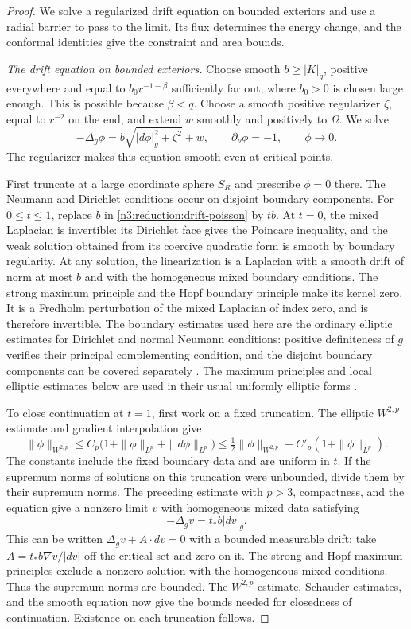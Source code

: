 \begin{proof}
We solve a regularized drift equation on bounded exteriors and use a
radial barrier to pass to the limit. Its flux determines the energy
change, and the conformal identities give the constraint and area bounds.

\emph{The drift equation on bounded exteriors.} Choose smooth
$b\ge|K|_g$, positive everywhere and equal to
$b_0r^{-1-\beta}$ sufficiently far out, where $b_0>0$ is chosen large
enough.  This is possible because $\beta<q$.  Choose a smooth positive
regularizer $\zeta$, equal to $r^{-2}$ on the end, and extend $w$ smoothly
and positively to $\Omega$.  We solve
\begin{equation}
 \label{n3:reduction:drift-poisson}
 -\Delta_g\phi=b\sqrt{|d\phi|_g^2+\zeta^2}+w,
 \qquad \partial_\nu\phi=-1,
 \qquad \phi\longrightarrow0.
\end{equation}
The regularizer makes this equation smooth even at critical points.

First truncate at a large coordinate sphere $S_R$ and prescribe
$\phi=0$ there.  The Neumann and Dirichlet conditions occur on disjoint
boundary components.  For $0\le t\le1$, replace $b$ in
\eqref{n3:reduction:drift-poisson} by $tb$.  At $t=0$, the mixed
Laplacian is invertible: its Dirichlet face gives the Poincare inequality,
and the weak solution obtained from its coercive quadratic form is smooth
by boundary regularity.  At any solution, the linearization is a
Laplacian with a smooth drift of norm at most $b$ and with the homogeneous
mixed boundary conditions.  The strong maximum principle and the Hopf
boundary principle make its kernel zero.  It is a Fredholm perturbation
of the mixed Laplacian of index zero, and is therefore invertible.
The boundary estimates used here are the ordinary elliptic estimates
for Dirichlet and normal Neumann conditions: positive definiteness of
$g$ verifies their principal complementing condition, and the disjoint
boundary components can be covered separately
\cite{AgmonDouglisNirenberg1959}.  The maximum principles and local
elliptic estimates below are used in their usual uniformly elliptic
forms \cite{GilbargTrudinger}.

To close continuation at $t=1$, first work on a fixed truncation.
The elliptic $W^{2,p}$ estimate
and gradient interpolation give
\[
 \|\phi\|_{W^{2,p}}
 \le C_p\bigl(1+\|\phi\|_{L^p}+\|d\phi\|_{L^p}\bigr)
 \le \tfrac12\|\phi\|_{W^{2,p}}
       +C'_p(1+\|\phi\|_{L^p}).
\]
The constants include the fixed boundary data and are uniform in $t$.
If the supremum norms of solutions on this truncation were unbounded,
divide them by their supremum norms.  The preceding estimate with
$p>3$, compactness, and the equation give a nonzero limit $v$ with
homogeneous mixed data satisfying
\[
 -\Delta_gv=t_*b|dv|_g.
\]
This can be written $\Delta_gv+A\cdot dv=0$ with a bounded measurable
drift: take $A=t_*b\nabla v/|dv|$ off the critical set and zero on it.
The strong and Hopf maximum principles exclude a nonzero solution with
the homogeneous mixed conditions.  Thus the supremum norms are bounded.
The $W^{2,p}$ estimate, Schauder estimates, and the smooth equation now
give the bounds needed for closedness of continuation.  Existence on
each truncation follows.


\end{proof}
